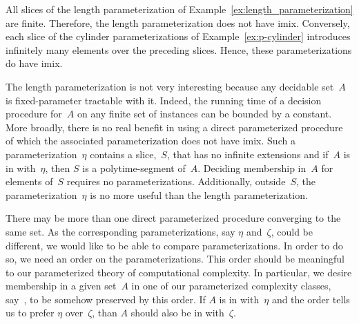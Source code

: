 \begin{example}
\label{ex:imix}%
  All slices of the length parameterization of Example~\ref{ex:length_parameterization} are finite.
  Therefore, the length parameterization does not have imix.
  Conversely, each slice of the \pdash{}cylinder parameterizations of Example~\ref{ex:p-cylinder} introduces infinitely many elements over the preceding slices.
  Hence, these parameterizations do have imix.
\end{example}

\label{p:imix}%
The length parameterization is not very interesting because any decidable set~$A$ is fixed-parameter tractable with it.
Indeed, the running time of a decision procedure for~$A$ on any finite set of instances can be bounded by a constant.
More broadly, there is no real benefit in using a direct parameterized procedure of which the associated parameterization does not have imix.
Such a parameterization~$\eta$ contains a slice,~$S$, that has no infinite extensions and if~$A$ is in  with~$\eta$, then $S$ is a polytime-segment of~$A$.
Deciding membership in~$A$ for elements of~$S$ requires no parameterizations.
Additionally, outside~$S$, the parameterization~$\eta$ is no more useful than the length parameterization.

There may be more than one direct parameterized procedure converging to the same set.
As the corresponding parameterizations, say $\eta$ and~$\zeta$, could be different, we would like to be able to compare parameterizations.
In order to do so, we need an order on the parameterizations.
This order should be meaningful to our parameterized theory of computational complexity.
In particular, we desire membership in a given set~$A$ in one of our parameterized complexity classes, say~, to be somehow preserved by this order.
If $A$ is in  with~$\eta$ and the order tells us to prefer $\eta$ over~$\zeta$, than $A$ should also be in  with~$\zeta$.

